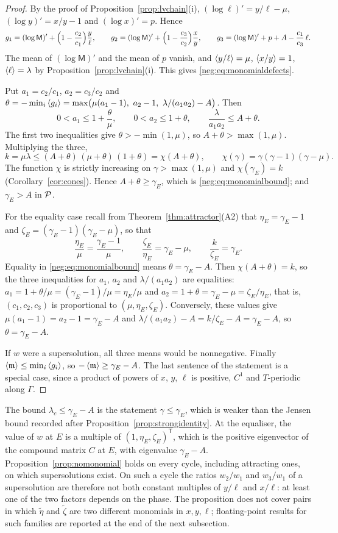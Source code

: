 \begin{proof}
By the proof of Proposition~\ref{prop:lvchain}(i), $(\log\ell)'=y/\ell-\mu$, $(\log y)'=x/y-1$ and $(\log x)'=p$. Hence
\[
g_1=(\log\mathsf M)'+\Bigl(1-\frac{c_2}{c_1}\Bigr)\frac y\ell,\qquad
g_2=(\log\mathsf M)'+\Bigl(1-\frac{c_3}{c_2}\Bigr)\frac xy,\qquad
g_3=(\log\mathsf M)'+p+A-\frac{c_1}{c_3}\,\ell .
\]
The mean of $(\log\mathsf M)'$ and the mean of $p$ vanish, and $\left\langle y/\ell\right\rangle=\mu$, $\left\langle x/y\right\rangle=1$, $\left\langle \ell\right\rangle=\lambda$ by Proposition~\ref{prop:lvchain}(i). This gives \eqref{neg:eq:monomialdefects}.

Put $a_1=c_2/c_1$, $a_2=c_3/c_2$ and $\theta=-\min_i\avg{g_i}=\max\bigl(\mu(a_1-1),\ a_2-1,\ \lambda/(a_1a_2)-A\bigr)$. Then
\[
0<a_1\le1+\frac\theta\mu,\qquad 0<a_2\le1+\theta,\qquad \frac{\lambda}{a_1a_2}\le A+\theta .
\]
The first two inequalities give $\theta>-\min(1,\mu)$, so $A+\theta>\max(1,\mu)$. Multiplying the three,
\[
k=\mu\lambda\le(A+\theta)\,(\mu+\theta)\,(1+\theta)=\chi(A+\theta),\qquad \chi(\gamma)=\gamma(\gamma-1)(\gamma-\mu).
\]
The function $\chi$ is strictly increasing on $\gamma>\max(1,\mu)$ and $\chi(\gamma_E)=k$ (Corollary~\ref{cor:cones}). Hence $A+\theta\ge\gamma_E$, which is \eqref{neg:eq:monomialbound}; and $\gamma_E>A$ in $\mathcal P$.

For the equality case recall from Theorem~\ref{thm:attractor}(A2) that $\eta_E=\gamma_E-1$ and $\zeta_E=(\gamma_E-1)(\gamma_E-\mu)$, so that
\[
\frac{\eta_E}{\mu}=\frac{\gamma_E-1}{\mu},\qquad \frac{\zeta_E}{\eta_E}=\gamma_E-\mu,\qquad \frac{k}{\zeta_E}=\gamma_E .
\]
Equality in \eqref{neg:eq:monomialbound} means $\theta=\gamma_E-A$. Then $\chi(A+\theta)=k$, so the three inequalities for $a_1$, $a_2$ and $\lambda/(a_1a_2)$ are equalities: $a_1=1+\theta/\mu=(\gamma_E-1)/\mu=\eta_E/\mu$ and $a_2=1+\theta=\gamma_E-\mu=\zeta_E/\eta_E$, that is, $(c_1,c_2,c_3)$ is proportional to $(\mu,\eta_E,\zeta_E)$. Conversely, these values give $\mu(a_1-1)=a_2-1=\gamma_E-A$ and $\lambda/(a_1a_2)-A=k/\zeta_E-A=\gamma_E-A$, so $\theta=\gamma_E-A$.

If $w$ were a supersolution, all three means would be nonnegative. Finally $\left\langle \mathfrak m\right\rangle\le\min_i\left\langle g_i\right\rangle$, so $-\left\langle \mathfrak m\right\rangle\ge\gamma_E-A$. The last sentence of the statement is a special case, since a product of powers of $x$, $y$, $\ell$ is positive, $C^1$ and $T$-periodic along $\Gamma$.
\end{proof}
The bound $\lambda_c\le\gamma_E-A$ is the statement $\gamma\le\gamma_E$, which is weaker than the Jensen bound recorded after Proposition~\ref{prop:strongidentity}. At the equaliser, the value of $w$ at $E$ is a multiple of $(1,\eta_E,\zeta_E)^{\mathsf T}$, which is the positive eigenvector of the compound matrix $C$ at $E$, with eigenvalue $\gamma_E-A$. Proposition~\ref{prop:nomonomial} holds on every cycle, including attracting ones, on which supersolutions exist. On such a cycle the ratios $w_2/w_1$ and $w_3/w_1$ of a supersolution are therefore not both constant multiples of $y/\ell$ and $x/\ell$: at least one of the two factors depends on the phase. The proposition does not cover pairs in which $\tilde\eta$ and $\tilde\zeta$ are two different monomials in $x,y,\ell$; floating-point results for such families are reported at the end of the next subsection.

